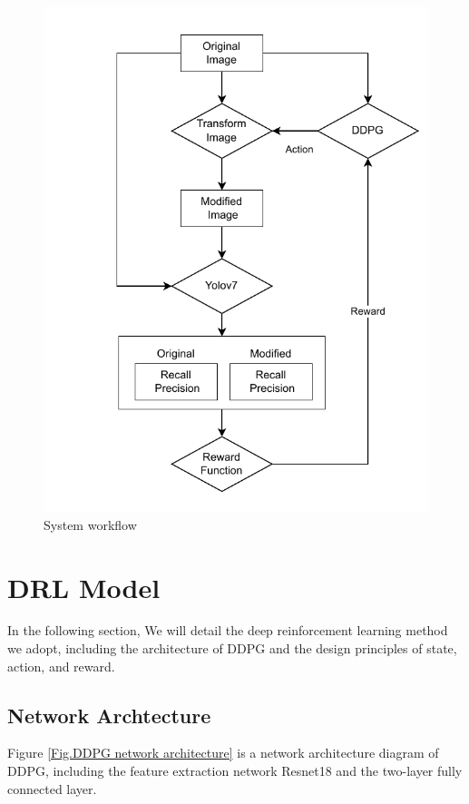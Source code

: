 \documentclass{PHlab-thesis}
\begin{document}
\begin{figure}[htb] 
\centering 
\includegraphics[width=\textwidth,height=\textheight,keepaspectratio]{images/system workflow.pdf}
\caption{System workflow} 
\label{Fig.System workflow} 
\end{figure}

\section{DRL Model}
In the following section, We will detail the deep reinforcement learning method we adopt, including the architecture of DDPG and the design principles of state, action, and reward.

\subsection{Network Archtecture}
Figure \ref{Fig.DDPG network architecture} is a network architecture diagram of DDPG, including the feature extraction network Resnet18 and the two-layer fully connected layer.
\end{document}
